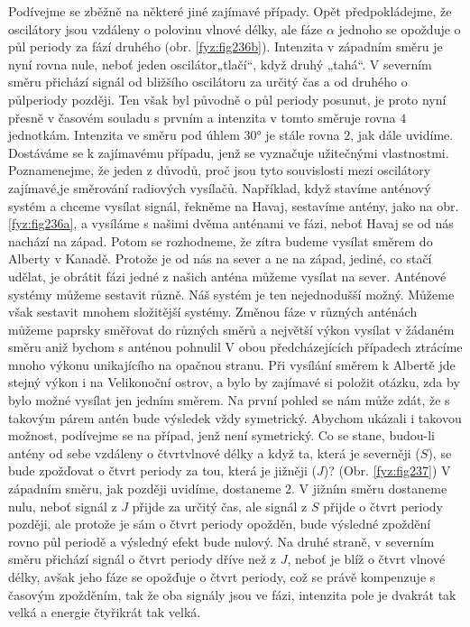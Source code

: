 {    Podívejme se zběžně na některé jiné zajímavé případy. Opět předpokládejme, že oscilátory jsou 
    vzdáleny o polovinu vlnové délky, ale fáze \(\alpha\) jednoho se opožduje o půl periody za fází 
    druhého (obr. \ref{fyz:fig236b}). Intenzita v západním směru je nyní rovna nule, neboť jeden 
    oscilátor„tlačí“, když druhý „tahá“. V severním směru přichází signál od bližšího oscilátoru za 
    určitý čas a od druhého o půlperiody později. Ten však byl původně o půl periody posunut, je 
    proto nyní přesně v časovém souladu s prvním a intenzita v tomto směruje rovna \(4\) jednotkám. 
    Intenzita ve směru pod úhlem \ang{30} je stále rovna \(2\), jak dále uvidíme. Dostáváme se k 
    zajímavému případu, jenž se vyznačuje užitečnými vlastnostmi. Poznamenejme, že jeden z důvodů, 
    proč jsou tyto souvislosti mezi oscilátory zajímavé,je směrování radiových vysílačů. Například, 
    když stavíme anténový systém a chceme vysílat signál, řekněme na Havaj, sestavíme antény, jako 
    na obr. \ref{fyz:fig236a}, a vysíláme s našimi dvěma anténami ve fázi, neboť Havaj se od nás 
    nachází na západ. Potom se rozhodneme, že zítra budeme vysílat směrem do Alberty v Kanadě. 
    Protože je od nás na sever a ne na západ, jediné, co stačí udělat, je obrátit fázi jedné z 
    našich anténa můžeme vysílat na sever. Anténové systémy můžeme sestavit různě. Náš systém je 
    ten nejednodušší možný. Můžeme však sestavit mnohem složitější systémy. Změnou fáze v různých 
    anténách můžeme paprsky směřovat do různých směrů a největší výkon vysílat v žádaném směru aniž 
    bychom s anténou pohnulil V obou předcházejících případech ztrácíme mnoho výkonu unikajícího na 
    opačnou stranu. Při vysílání směrem k Albertě jde stejný výkon i na Velikonoční ostrov, a bylo 
    by zajímavé si položit otázku, zda by bylo možné vysílat jen jedním směrem. Na první pohled se 
    nám může zdát, že s takovým párem antén bude výsledek vždy symetrický. Abychom ukázali i 
    takovou možnost, podívejme se na případ, jenž není symetrický. Co se stane, budou-li antény od 
    sebe vzdáleny o čtvrtvlnové délky a když ta, která je severněji (\(S\)), se bude zpožďovat o 
    čtvrt periody za tou, která je jižněji (\(J\))? (Obr. \ref{fyz:fig237}) V západním směru, jak 
    později uvidíme, dostaneme \(2\). V jižním směru dostaneme nulu, neboť signál z \(J\) přijde za 
    určitý čas, ale signál z \(S\) přijde o čtvrt periody později, ale protože je sám o čtvrt 
    periody opožděn, bude výsledné zpoždění rovno půl periodě a výsledný efekt bude nulový. Na 
    druhé straně, v severním směru přichází signál o čtvrt periody dříve než z \(J\), neboť je blíž 
    o čtvrt vlnové délky, avšak jeho fáze se opožďuje o čtvrt periody, což se právě kompenzuje s 
    časovým zpožděním, tak že oba signály jsou ve fázi, intenzita pole je dvakrát tak velká a 
    energie čtyřikrát tak velká.

}
